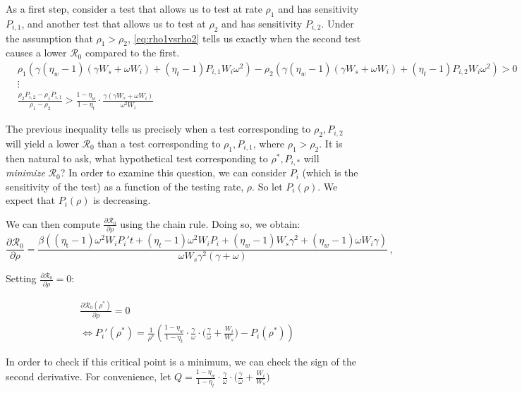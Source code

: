 \documentclass{article}
\newcommand{\Rnum}{\mathcal{R}_0}
\begin{document}
As a first step, consider a test that allows us to test at rate $\rho_1$ and has sensitivity $P_{i,1}$, and another test that allows us to test at $\rho_2$ and has sensitivity $P_{i,2}$. Under the assumption that $\rho_1 > \rho_2$, \cref{eq:rho1vsrho2} tells us exactly when the second test causes a lower $\Rnum$ compared to the first. 
\begin{align}\label{eq:rho1vsrho2}
    &\rho_1\left(\gamma(\eta_w-1)(\gamma W_s + \omega W_i) + (\eta_t-1)P_{i, 1}W_i\omega^2\right) - \rho_2\left(\gamma(\eta_w-1)(\gamma W_s + \omega W_i) + (\eta_t-1)P_{i, 2}W_i\omega^2\right) > 0 \nonumber \\
    &\vdots \nonumber \\
    &\frac{\rho_2P_{i, 2}-\rho_1P_{i, 1} }{\rho_1-\rho_2} > \frac{1-\eta_w}{1-\eta_t}\cdot \frac{\gamma(\gamma W_s + \omega W_i)}{\omega^2 W_i}
\end{align}

The previous inequality tells us precisely when a test corresponding to $\rho_2, P_{i,2}$ will yield a lower $\Rnum$ than a test corresponding to $\rho_1, P_{i,1}$, where $\rho_1 > \rho_2$. It is then natural to ask, what hypothetical test corresponding to $\rho^*, P_{i,*}$ will \textit{minimize} $\Rnum$? In order to examine this question, we can consider $P_i$ (which is the sensitivity of the test) as a function of the testing rate, $\rho$. So let $P_i(\rho)$. We expect that $P_i(\rho)$ is decreasing. 

We can then compute $\frac{\partial \Rnum}{\partial \rho}$ using the chain rule. Doing so, we obtain:
\begin{equation}
\frac{\partial \Rnum}{\partial \rho} = \dfrac{\beta\left(\left(\eta_\text{t}-1\right)\omega^2W_iP_i't+\left(\eta_t-1\right)\omega^2W_iP_i+\left(\eta_w-1\right)W_s\gamma^2+\left(\eta_w-1\right)\omega W_i\gamma\right)}{\omega W_s\gamma^2\left(\gamma+\omega\right)}\,,
\end{equation}

Setting $\frac{\partial \Rnum}{\partial \rho} = 0$:

\begin{align}\label{eq:r0rho=0}
    &\frac{\partial \Rnum(\rho^*)}{\partial \rho} = 0 \nonumber \\
    &\Longleftrightarrow P_i'(\rho^*) = \frac{1}{\rho^*} \left( \frac{1-\eta_w}{1-\eta_t}\cdot\frac{\gamma}{\omega}\cdot\big(\frac{\gamma}{\omega}+\frac{W_i}{W_s}\big) - P_i(\rho^*)\right)
\end{align}

In order to check if this critical point is a minimum, we can check the sign of the second derivative. For convenience, let $Q = \frac{1-\eta_w}{1-\eta_t}\cdot\frac{\gamma}{\omega}\cdot\big(\frac{\gamma}{\omega}+\frac{W_i}{W_s}\big)$
\end{document}
